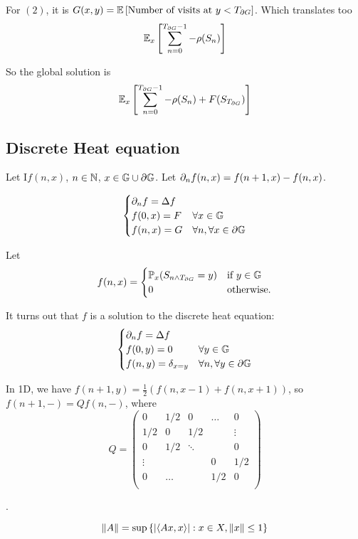     For $(2)$, it is $G(x, y) = \mathbb{E}\left[\text{Number of visits at } y < T_{\partial G}\right]$.
    Which translates too \[
        \mathbb{E}_x \left[ 
            \sum_{n = 0}^{T_{\partial G} - 1} 
                -\rho(S_n)
        \right]
    \]

    So the global solution is \[
        \mathbb{E}_x\left[ 
            \sum_{n = 0}^{T_{\partial G} - 1} 
                -\rho(S_n)
            + F(S_{T_{\partial G}})
         \right]
    \]

    \subsection{Discrete Heat equation}

    Let I$f(n, x)$, $n \in \mathbb N$, $x \in \mathbb G \cup \partial \mathbb G$.
    Let $\partial_n f(n, x) = f(n + 1, x) - f(n, x)$.

    \begin{definition}
        \[
            \begin{cases}
                \partial_n f = \Delta f \\
                f(0, x) = F & \forall x \in \mathbb G \\
                f(n, x) = G & \forall n, \forall x \in \partial \mathbb G
            \end{cases}
        \]
    \end{definition}

    Let \[
        f(n, x) = \begin{cases}
            \mathbb P_x(S_{n \wedge T_{\partial G}} = y) & \text{if } y \in \mathbb G \\
            0 & \text{otherwise}.
        \end{cases}
    \]

    It turns out that $f$ is a solution to the discrete heat equation:
    \[
        \begin{cases}
            \partial_n f = \Delta f \\
            f(0, y) = 0 & \forall y \in \mathbb G \\
            f(n, y) = \delta_{x = y} & \forall n, \forall y \in \partial \mathbb G
        \end{cases}
    \]

    In 1D, we have $f(n + 1, y) = \frac{1}{2}(f(n, x-1) + f(n, x+1))$,
    so $f(n+1, -) = Qf(n, -)$, where \[
        Q = \begin{pmatrix*}
            0 & 1/2 & 0 & \dots & 0 \\
            1/2 & 0 & 1/2  && \vdots\\
            0 & 1/2 & \ddots && 0 \\
            \vdots &&& 0 & 1/2 \\
            0 & \dots & & 1/2 & 0 \\
        \end{pmatrix*}    
    \]
    


    \newpage
    .

    \[  
        \left\| A \right\| = \sup \left\{ \left| 
            \langle Ax, x \rangle
         \right| :
            x \in X, \left\| x \right\| \leq 1
         \right\}
    \]

